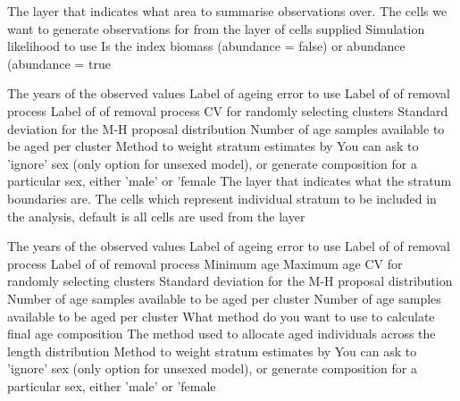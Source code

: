  {The layer that indicates what area to summarise observations over.}
 {The cells we want to generate observations for from the layer of cells supplied}
 {Simulation likelihood to use}
 {Is the index biomass (abundance = false) or abundance (abundance = true}
\par\textbf{}\par
{} {The years of the observed values}
 {Label of ageing error to use}
 {Label of of removal process}
 {Label of of removal process}
 {CV for randomly selecting clusters}
 {}
 {Standard deviation for the M-H proposal distribution}
 {Number of age samples available to be aged per cluster}
 {Method to weight stratum estimates by}
 {You can ask to 'ignore' sex (only option for unsexed model), or generate composition for a particular sex, either 'male' or 'female}
 {The layer that indicates what the stratum boundaries are.}
 {The cells which represent individual stratum to be included in the analysis, default is all cells are used from the layer}
\par\textbf{}\par
{} {The years of the observed values}
 {Label of ageing error to use}
 {Label of of removal process}
 {Label of of removal process}
 {Minimum age}
 {Maximum age}
 {CV for randomly selecting clusters}
 {Standard deviation for the M-H proposal distribution}
 {Number of age samples available to be aged per cluster}
 {Number of age samples available to be aged per cluster}
 {What method do you want to use to calculate final age composition}
 {The method used to allocate aged individuals across the length distribution}
 {Method to weight stratum estimates by}
 {You can ask to 'ignore' sex (only option for unsexed model), or generate composition for a particular sex, either 'male' or 'female}
